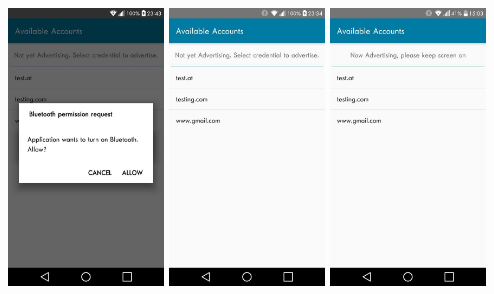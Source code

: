 \documentclass{beamer}
\begin{document}
\begin{frame}{}
\vfill
\centering
\includegraphics[width=0.31\textwidth]{images/BT_english.jpg}
\hspace{0.1cm}
\includegraphics[width=0.31\textwidth]{images/AvailableAccounts.jpg}
\hspace{0.1cm}
\includegraphics[width=0.31\textwidth]{images/NowAdvertising.jpg}

\vfill
\end{frame}
\end{document}
